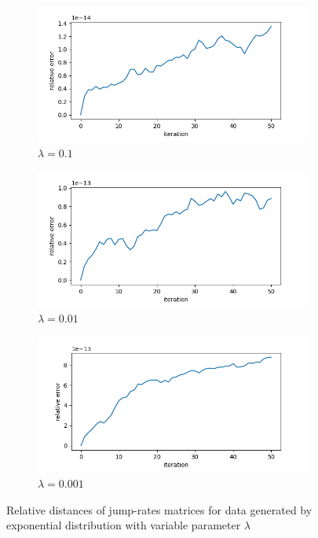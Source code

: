 \documentclass[thesis=M,english]{FITthesis}[2012/10/20]
\begin{document}
\begin{figure}
\centering
\begin{subfigure}{.9\textwidth}
  \centering
  \includegraphics[width=1\linewidth]{img/ex3/0_1.png}
  \caption{ $\lambda = 0.1$ }
  \label{fig:l1}
\end{subfigure}
\begin{subfigure}{.9\textwidth}
  \centering
  \includegraphics[width=1\linewidth]{img/ex3/00_1.png}
  \caption{$\lambda = 0.01$}
  \label{fig:l2}
\end{subfigure}
\begin{subfigure}{.9\textwidth}
  \centering
  \includegraphics[width=1\linewidth]{img/ex3/000_1.png}
  \caption{$\lambda = 0.001$}
  \label{fig:l3}
\end{subfigure}
\caption{Relative distances of jump-rates matrices for data generated by exponential distribution with variable parameter $\lambda$}
\label{fig:test}
\end{figure}
\end{document}
